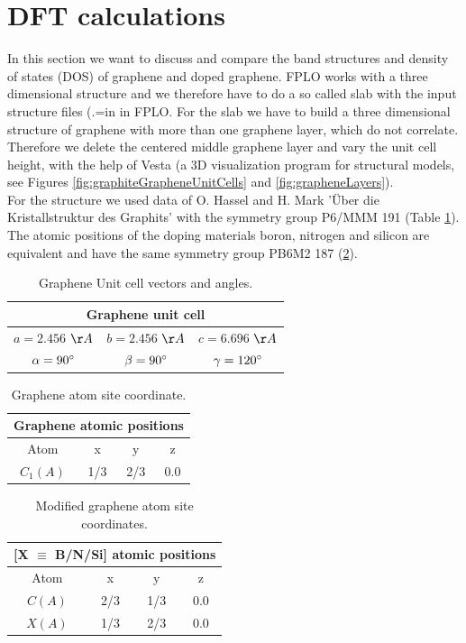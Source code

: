 		\section{DFT calculations}
			In this section we want to discuss and compare the band structures and density of states (DOS) of graphene and doped graphene. FPLO works with a three dimensional structure and we therefore have to do a so called slab with the input structure files (.=in in FPLO. For the slab we have to build a three dimensional structure of graphene with more than one graphene layer, which do not correlate. Therefore we delete the centered middle graphene layer and vary the unit cell height, with the help of Vesta (a 3D visualization program for structural models, see Figures \ref{fig:graphiteGrapheneUnitCells} and \ref{fig:grapheneLayers}). \\
			For the structure we used data of O. Hassel and H. Mark 'Über die Kristallstruktur des Graphits' \cite{GraphiteCif} with the symmetry group P6/MMM 191 (Table \ref{table:grapheneAtomicPositions}). The atomic positions of the doping materials boron, nitrogen and silicon are equivalent and have the same symmetry group PB6M2 187 (\ref{table:impurityAtomicPositions}). \\
			\begin{table}[H]
				\centering
				\begin{tabular}{ccc}
					\multicolumn{3}{c}{\textbf{Graphene unit cell}} \\
					\midrule
					 $a = 2.456$ $\AA$ &$b = 2.456$ $\AA$ & $c = 6.696$ 
					 $\AA$ \\
					 $\alpha = 90^\circ$ & $\beta = 90^\circ$ & $\gamma = 120 ^\circ$ \\
					\bottomrule
				\end{tabular}
				\caption{Graphene Unit cell vectors and angles.}
			\end{table}
			\begin{table}[H]
				\centering
				\begin{tabular}{cccc}
					\multicolumn{4}{c}{\textbf{Graphene atomic positions}} \\
					\midrule
					Atom & x & y & z \\
					\midrule 
					$C_1(A)$ & 1/3 & 2/3 & 0.0 \\
					\bottomrule	
				\end{tabular}
				\caption{Graphene atom site coordinate.}
				\label{table:grapheneAtomicPositions}
			\end{table}
			\begin{table}[H]
				\centering
				\begin{tabular}{cccc}
					\multicolumn{4}{c}{\textbf{[X $\equiv$ B/N/Si] atomic positions}} \\
					\midrule
					Atom & x & y & z \\
					\midrule 
					$C(A)$ & 2/3 & 1/3 & 0.0 \\
					$X(A)$ & 1/3 & 2/3 & 0.0 \\
					\bottomrule	
				\end{tabular}
				\caption{Modified graphene atom site coordinates.}
				\label{table:impurityAtomicPositions}
			\end{table}
